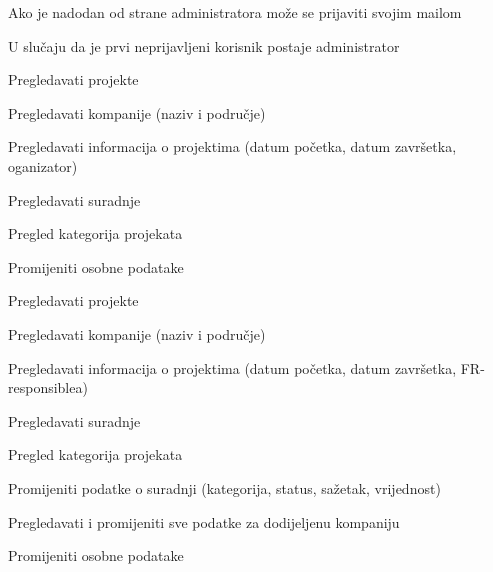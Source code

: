 			
			\begin{packed_enum}
				\item  {}

				\begin{packed_enum}

					\item Ako je nadodan od strane administratora može se prijaviti svojim mailom
					\item U slučaju da je prvi neprijavljeni korisnik postaje administrator

				\end{packed_enum}

				\item  {}
				
				\begin{packed_enum}
					
					\item Pregledavati projekte
					\item Pregledavati kompanije (naziv i područje)
					\item Pregledavati informacija o projektima (datum početka, datum završetka, oganizator)
					\item Pregledavati suradnje
					\item Pregled kategorija projekata
					\item Promijeniti osobne podatake
					
				\end{packed_enum}

				\item  {}

				\begin{packed_enum}

					\item Pregledavati projekte
					\item Pregledavati kompanije (naziv i područje)
					\item Pregledavati informacija o projektima (datum početka, datum završetka, FR-responsiblea)
					\item Pregledavati suradnje
					\item Pregled kategorija projekata
					\item Promijeniti podatke o suradnji (kategorija, status, sažetak, vrijednost)
					\item Pregledavati i promijeniti sve podatke za dodijeljenu kompaniju
					\item Promijeniti osobne podatake


\end{packed_enum}
\end{packed_enum}
